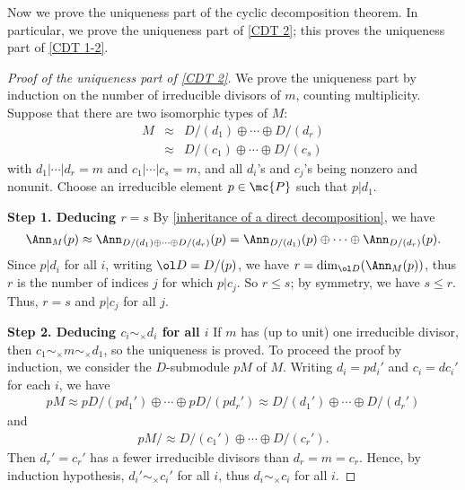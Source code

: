 Now we prove the uniqueness part of the cyclic decomposition theorem.
In particular, we prove the uniqueness part of \cref{CDT 2}; this proves the uniqueness part of \cref{CDT 1-2}.
\begin{proof}[Proof of the uniqueness part of \cref{CDT 2}]
    We prove the uniqueness part by induction on the number of irreducible divisors of $m$, counting multiplicity.
    Suppose that there are two isomorphic types of $M$:
    \begin{eqnarray*}
        M
        &\approx& D/(d_1)\oplus\cdots\oplus D/(d_r)\\
        &\approx& D/(c_1)\oplus\cdots\oplus D/(c_s)
    \end{eqnarray*}
    with $d_1|\cdots|d_r=m$ and $c_1|\cdots|c_s=m$, and all $d_i$'s and $c_j$'s being nonzero and nonunit.
    Choose an irreducible element $p\in\mc{P}$ such that $p|d_1$.

    \textbf{Step 1. Deducing $r=s$}\newline\indent
    By \cref{inheritance of a direct decomposition}, we have
    \begin{align*}
        \Ann_M(p)\approx\Ann_{D/(d_1)\oplus\cdots\oplus D/(d_r)}(p)=\Ann_{D/(d_1)}(p)\oplus\cdots\oplus\Ann_{D/(d_r)}(p).
    \end{align*}
    Since $p|d_i$ for all $i$, writing $\ol D=D/(p)$, we have $r=\dim_{\ol D}(\Ann_M(p))$, thus $r$ is the number of indices $j$ for which $p|c_j$.
    So $r\leq s$; by symmetry, we have $s\leq r$.
    Thus, $r=s$ and $p|c_j$ for all $j$.

    \textbf{Step 2. Deducing $c_i\sim_\times d_i$ for all $i$}\newline\indent
    If $m$ has (up to unit) one irreducible divisor, then $c_1\sim_\times m\sim_\times d_1$, so the uniqueness is proved.
    To proceed the proof by induction, we consider the $D$-submodule $pM$ of $M$.
    Writing $d_i=pd_i'$ and $c_i=dc_i'$ for each $i$, we have
    \begin{align*}
        pM\approx pD/(pd_1')\oplus\cdots\oplus pD/(pd_r')\approx D/(d_1')\oplus\cdots\oplus D/(d_r')
    \end{align*}
    and
    \begin{align*}
        pM/\approx D/(c_1')\oplus\cdots\oplus D/(c_r').
    \end{align*}
    Then $d_r'=c_r'$ has a fewer irreducible divisors than $d_r=m=c_r$.
    Hence, by induction hypothesis, $d_i'\sim_\times c_i'$ for all $i$, thus $d_i\sim_\times c_i$ for all $i$.
\end{proof}